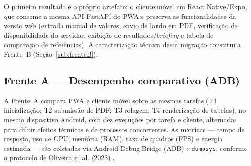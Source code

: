 \documentclass[12pt]{article}
\begin{document}
O primeiro resultado é o próprio artefato: o cliente móvel em React Native/Expo,
que consome a mesma API FastAPI do PWA e preserva as funcionalidades da versão
web (entrada manual de valores, envio de laudo em PDF, verificação de
disponibilidade do servidor, exibição de resultados/\emph{briefing} e tabela de
comparação de referências). A caracterização técnica dessa migração constitui a
Frente~B (Seção~\ref{sub:frenteB}).

\subsection{Frente A --- Desempenho comparativo (ADB)}
\label{sub:frenteA}

A Frente~A compara PWA e cliente móvel sobre as mesmas tarefas (T1 inicialização;
T2 submissão de PDF; T3 rolagem; T4 renderização de tabelas), no mesmo
dispositivo Android, com dez execuções por tarefa e cliente, alternadas para
diluir efeitos térmicos e de processos concorrentes. As métricas --- tempo de
resposta, uso de CPU, memória (RAM), taxa de quadros (FPS) e energia estimada ---
são coletadas via Android Debug Bridge (ADB) e \texttt{dumpsys}, conforme o
protocolo de Oliveira et al. (2023) \cite{oliveira2023}.
\end{document}
